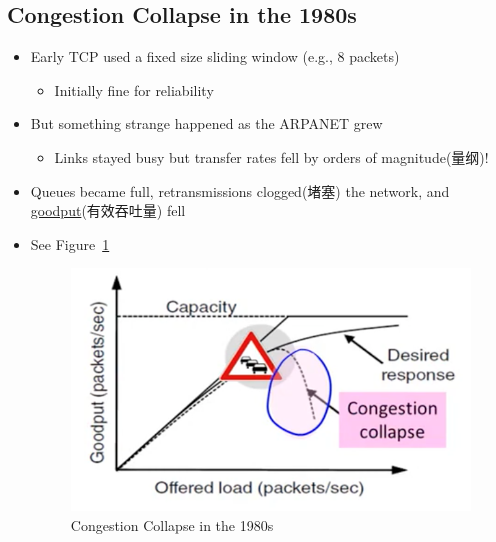 \documentclass[12pt]{ctexart}   %
\begin{document}
	\subsection{Congestion Collapse in the 1980s}
	\begin{itemize}
		\item Early TCP used a fixed size sliding window (e.g., 8 packets)
		\begin{itemize}
			\item Initially fine for reliability
		\end{itemize}
		
		\item But something strange happened as the ARPANET grew
		\begin{itemize}
			\item Links stayed busy but transfer rates fell by orders of magnitude(量纲)!
		\end{itemize}
		
		\item Queues became full, retransmissions clogged(堵塞) the network, and \underline{goodput}(有效吞吐量) fell
		\item See Figure~\ref{fig:7-4-1}
		  
		 \begin{figure}[h!] %
		\centering
		 \includegraphics[scale=0.7]{images/7-4-1}
		\caption{ Congestion Collapse in the 1980s }
		 \label{fig:7-4-1}
		 \end{figure}
	\end{itemize}
	
\end{document}
